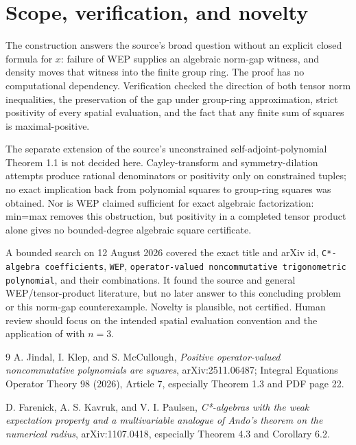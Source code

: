 \documentclass[11pt]{article}
\begin{document}
\section{Scope, verification, and novelty}

The construction answers the source's broad question without an explicit
closed formula for $x$: failure of WEP supplies an algebraic norm-gap witness,
and density moves that witness into the finite group ring.  The proof has no
computational dependency.  Verification checked the direction of both tensor
norm inequalities, the preservation of the gap under group-ring
approximation, strict positivity of every spatial evaluation, and the fact
that any finite sum of squares is maximal-positive.

The separate extension of the source's unconstrained self-adjoint-polynomial
Theorem 1.1 is not decided here.  Cayley-transform and symmetry-dilation
attempts produce rational denominators or positivity only on constrained
tuples; no exact implication back from polynomial squares to group-ring
squares was obtained.  Nor is WEP claimed sufficient for exact algebraic
factorization: min=max removes this obstruction, but positivity in a completed
tensor product alone gives no bounded-degree algebraic square certificate.

A bounded search on 12 August 2026 covered the exact title and arXiv id,
\texttt{C*-algebra coefficients}, \texttt{WEP},
\texttt{operator-valued noncommutative trigonometric polynomial}, and their
combinations.  It found the source and general WEP/tensor-product literature,
but no later answer to this concluding problem or this norm-gap
counterexample.  Novelty is plausible, not certified.  Human review should
focus on the intended spatial evaluation convention and the application of
\cite[Theorem 4.3]{FKP} with $n=3$.

\begin{thebibliography}{9}
A. Jindal, I. Klep, and S. McCullough,
\emph{Positive operator-valued noncommutative polynomials are squares},
arXiv:2511.06487; Integral Equations Operator Theory 98 (2026), Article 7,
especially Theorem 1.3 and PDF page 22.

D. Farenick, A. S. Kavruk, and V. I. Paulsen,
\emph{C*-algebras with the weak expectation property and a multivariable
analogue of Ando's theorem on the numerical radius},
arXiv:1107.0418, especially Theorem 4.3 and Corollary 6.2.
\end{thebibliography}
\end{document}
